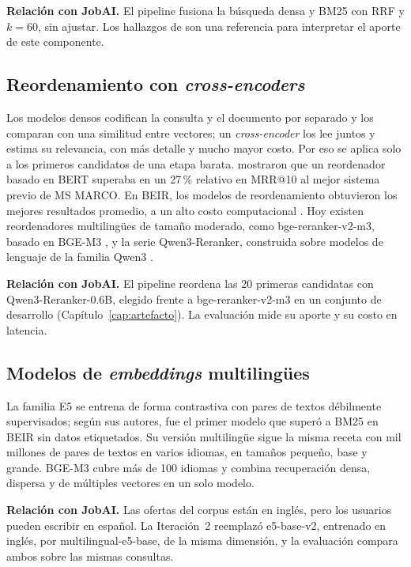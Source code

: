 \textbf{Relación con JobAI.} El pipeline fusiona la búsqueda densa y BM25 con RRF y $k = 60$, sin ajustar. Los hallazgos de \citet{Bruch2023} son una referencia para interpretar el aporte de este componente.

\subsection{Reordenamiento con \textit{cross-encoders}}

Los modelos densos codifican la consulta y el documento por separado y los comparan con una similitud entre vectores; un \textit{cross-encoder} los lee juntos y estima su relevancia, con más detalle y mucho mayor costo. Por eso se aplica solo a los primeros candidatos de una etapa barata. \citet{Nogueira2019} mostraron que un reordenador basado en BERT superaba en un 27\,\% relativo en MRR@10 al mejor sistema previo de MS MARCO. En BEIR, los modelos de reordenamiento obtuvieron los mejores resultados promedio, a un alto costo computacional \citep{Thakur2021}. Hoy existen reordenadores multilingües de tamaño moderado, como bge-reranker-v2-m3, basado en BGE-M3 \citep{Chen2024M3}, y la serie Qwen3-Reranker, construida sobre modelos de lenguaje de la familia Qwen3 \citep{Zhang2025Qwen3}.

\textbf{Relación con JobAI.} El pipeline reordena las 20 primeras candidatas con Qwen3-Reranker-0.6B, elegido frente a bge-reranker-v2-m3 en un conjunto de desarrollo (Capítulo~\ref{cap:artefacto}). La evaluación mide su aporte y su costo en latencia.

\subsection{Modelos de \textit{embeddings} multilingües}

La familia E5 \citep{Wang2022E5} se entrena de forma contrastiva con pares de textos débilmente supervisados; según sus autores, fue el primer modelo que superó a BM25 en BEIR sin datos etiquetados. Su versión multilingüe \citep{Wang2024mE5} sigue la misma receta con mil millones de pares de textos en varios idiomas, en tamaños pequeño, base y grande. BGE-M3 \citep{Chen2024M3} cubre más de 100 idiomas y combina recuperación densa, dispersa y de múltiples vectores en un solo modelo.

\textbf{Relación con JobAI.} Las ofertas del corpus están en inglés, pero los usuarios pueden escribir en español. La Iteración~2 reemplazó e5-base-v2, entrenado en inglés, por multilingual-e5-base, de la misma dimensión, y la evaluación compara ambos sobre las mismas consultas.


